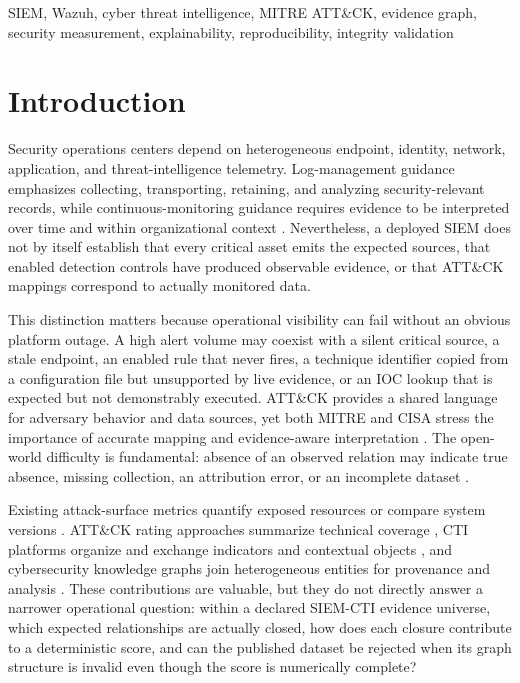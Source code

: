 \documentclass[a4paper,conference]{IEEEtran}
\begin{document}
\begin{IEEEkeywords}
SIEM, Wazuh, cyber threat intelligence, MITRE ATT\&CK, evidence graph, security measurement, explainability, reproducibility, integrity validation
\end{IEEEkeywords}

\section{Introduction}
Security operations centers depend on heterogeneous endpoint, identity, network, application, and threat-intelligence telemetry. Log-management guidance emphasizes collecting, transporting, retaining, and analyzing security-relevant records, while continuous-monitoring guidance requires evidence to be interpreted over time and within organizational context \cite{nist80092,nist800137,nistcsf20}. Nevertheless, a deployed SIEM does not by itself establish that every critical asset emits the expected sources, that enabled detection controls have produced observable evidence, or that ATT\&CK mappings correspond to actually monitored data.

This distinction matters because operational visibility can fail without an obvious platform outage. A high alert volume may coexist with a silent critical source, a stale endpoint, an enabled rule that never fires, a technique identifier copied from a configuration file but unsupported by live evidence, or an IOC lookup that is expected but not demonstrably executed. ATT\&CK provides a shared language for adversary behavior and data sources, yet both MITRE and CISA stress the importance of accurate mapping and evidence-aware interpretation \cite{mitre_matrix,mitre_datasources,mitre_philosophy,cisa_mapping}. The open-world difficulty is fundamental: absence of an observed relation may indicate true absence, missing collection, an attribution error, or an incomplete dataset \cite{sommer2010}.

Existing attack-surface metrics quantify exposed resources or compare system versions \cite{manadhata2011}. ATT\&CK rating approaches summarize technical coverage \cite{manocha2021,alsada2023}, CTI platforms organize and exchange indicators and contextual objects \cite{wagner2016,mavroeidis2017,oasis_stix,oasis_taxii}, and cybersecurity knowledge graphs join heterogeneous entities for provenance and analysis \cite{liu2022,w3cprov}. These contributions are valuable, but they do not directly answer a narrower operational question: within a declared SIEM-CTI evidence universe, which expected relationships are actually closed, how does each closure contribute to a deterministic score, and can the published dataset be rejected when its graph structure is invalid even though the score is numerically complete?
\end{document}
